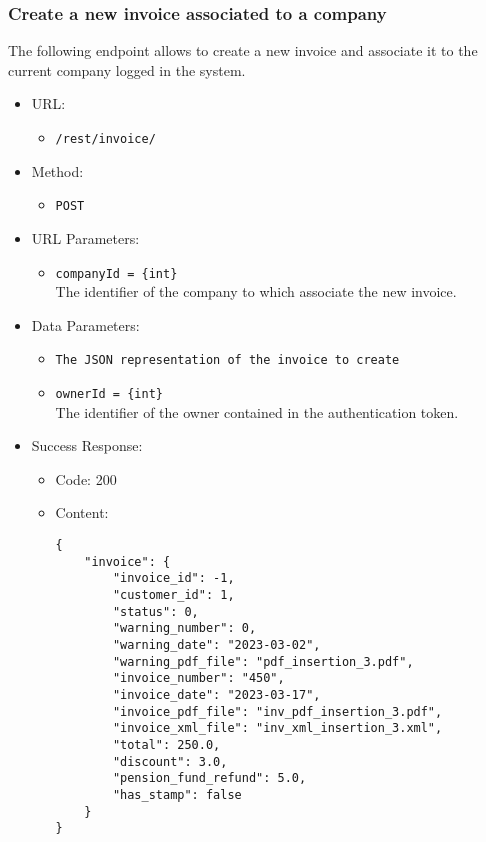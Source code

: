 \subsubsection*{Create a new invoice associated to a company}

The following endpoint allows to create a new invoice and associate it to the current company logged in the system.

\begin{itemize}
    
    \item URL: 
    \begin{itemize}
        \item \texttt{/rest/invoice/}
    \end{itemize}
    
    \item Method: 
    \begin{itemize}
        \item \texttt{POST}
    \end{itemize}
    
    \item URL Parameters: 
    \begin{itemize}
        \item \texttt{companyId = \{int\}} \\
        The identifier of the company to which associate the new invoice.
    \end{itemize}
    
    \item Data Parameters: 
    \begin{itemize}
        \item \texttt{The JSON representation of the invoice to create} 
        \item \texttt{ownerId = \{int\}} \\
        The identifier of the owner contained in the authentication token.
    \end{itemize}
    
    \item Success Response: 
    \begin{itemize}
        \item Code: 200
        \item Content:
        \begin{lstlisting}
{
    "invoice": {
        "invoice_id": -1,
        "customer_id": 1,
        "status": 0,
        "warning_number": 0,
        "warning_date": "2023-03-02",
        "warning_pdf_file": "pdf_insertion_3.pdf",
        "invoice_number": "450",
        "invoice_date": "2023-03-17",
        "invoice_pdf_file": "inv_pdf_insertion_3.pdf",
        "invoice_xml_file": "inv_xml_insertion_3.xml",
        "total": 250.0,
        "discount": 3.0,
        "pension_fund_refund": 5.0,
        "has_stamp": false
    }
}
        \end{lstlisting}    
    \end{itemize}
    

\end{itemize}
